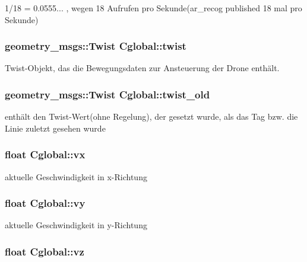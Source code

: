 1/18 = 0.0555... , wegen 18 Aufrufen pro Sekunde(ar\_\-recog published 18 mal pro Sekunde) 

\hypertarget{class_cglobal_acdd49b2fad30faf04785664c422f5ef7}{
\subsubsection[{twist}]{\setlength{\rightskip}{0pt plus 5cm}geometry\_\-msgs::Twist {\bf Cglobal::twist}}}
\label{class_cglobal_acdd49b2fad30faf04785664c422f5ef7}


Twist-\/Objekt, das die Bewegungsdaten zur Ansteuerung der Drone enthält. 

\hypertarget{class_cglobal_ae99f21083838b00781e4461e3e7accb9}{
\subsubsection[{twist\_\-old}]{\setlength{\rightskip}{0pt plus 5cm}geometry\_\-msgs::Twist {\bf Cglobal::twist\_\-old}}}
\label{class_cglobal_ae99f21083838b00781e4461e3e7accb9}


enthält den Twist-\/Wert(ohne Regelung), der gesetzt wurde, als das Tag bzw. die Linie zuletzt gesehen wurde 

\hypertarget{class_cglobal_abafbed62176301706747c04ef3046aae}{
\subsubsection[{vx}]{\setlength{\rightskip}{0pt plus 5cm}float {\bf Cglobal::vx}}}
\label{class_cglobal_abafbed62176301706747c04ef3046aae}


aktuelle Geschwindigkeit in x-\/Richtung 

\hypertarget{class_cglobal_a0967372a0ede7b8b9a24957df663b7b3}{
\subsubsection[{vy}]{\setlength{\rightskip}{0pt plus 5cm}float {\bf Cglobal::vy}}}
\label{class_cglobal_a0967372a0ede7b8b9a24957df663b7b3}


aktuelle Geschwindigkeit in y-\/Richtung 

\hypertarget{class_cglobal_af9ef9759f83ae67b7e220570a7738ef5}{
\subsubsection[{vz}]{\setlength{\rightskip}{0pt plus 5cm}float {\bf Cglobal::vz}}}
\label{class_cglobal_af9ef9759f83ae67b7e220570a7738ef5}


